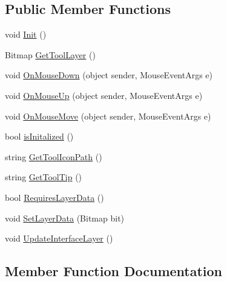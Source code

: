 \subsection*{Public Member Functions}
\begin{DoxyCompactItemize}
\item 
void \mbox{\hyperlink{interface_paint___program_1_1_i_tool_af823123a30fbda34e24e907243241046}{Init}} ()
\item 
Bitmap \mbox{\hyperlink{interface_paint___program_1_1_i_tool_a9b057905515f42a988c166a6a40318e0}{Get\+Tool\+Layer}} ()
\item 
void \mbox{\hyperlink{interface_paint___program_1_1_i_tool_a73d8797f4f2b1e0d8efe8aadcd44e840}{On\+Mouse\+Down}} (object sender, Mouse\+Event\+Args e)
\item 
void \mbox{\hyperlink{interface_paint___program_1_1_i_tool_a47984c2879213022f1684c07f7bba73e}{On\+Mouse\+Up}} (object sender, Mouse\+Event\+Args e)
\item 
void \mbox{\hyperlink{interface_paint___program_1_1_i_tool_a6a1cbe840b5cfc8a9b9463cc21590845}{On\+Mouse\+Move}} (object sender, Mouse\+Event\+Args e)
\item 
bool \mbox{\hyperlink{interface_paint___program_1_1_i_tool_a951b844bcbf47a6c306104fa86be7a5d}{is\+Initalized}} ()
\item 
string \mbox{\hyperlink{interface_paint___program_1_1_i_tool_aa057d2f99c59d7bec0215dcad2da1b72}{Get\+Tool\+Icon\+Path}} ()
\item 
string \mbox{\hyperlink{interface_paint___program_1_1_i_tool_ac11f1591587144b6e74f5767bbf1df56}{Get\+Tool\+Tip}} ()
\item 
bool \mbox{\hyperlink{interface_paint___program_1_1_i_tool_a6d45b6c48da8130ae41db3a66cdaef9a}{Requires\+Layer\+Data}} ()
\item 
void \mbox{\hyperlink{interface_paint___program_1_1_i_tool_a2d3e63715dfe04075d27dacf367d1633}{Set\+Layer\+Data}} (Bitmap bit)
\item 
void \mbox{\hyperlink{interface_paint___program_1_1_i_tool_a36db75d29e88dfd739f658633c40e955}{Update\+Interface\+Layer}} ()
\end{DoxyCompactItemize}


\subsection{Member Function Documentation}
\mbox{\label{interface_paint___program_1_1_i_tool_aa057d2f99c59d7bec0215dcad2da1b72}} 
